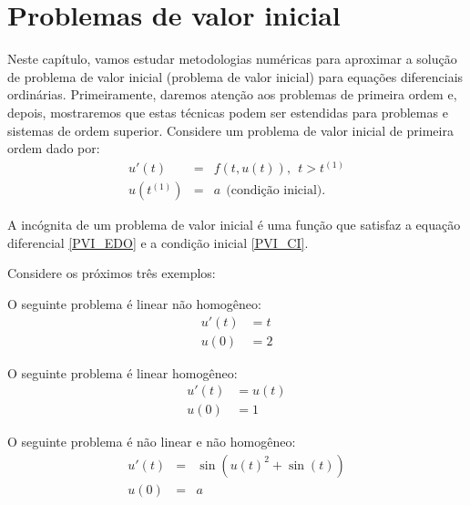 
%

\chapter{Problemas de valor inicial}
Neste capítulo, vamos estudar metodologias numéricas para aproximar a solução de problema de valor inicial (problema de valor inicial) para equações diferenciais ordinárias. Primeiramente, daremos atenção aos problemas de primeira ordem e, depois, mostraremos que estas técnicas podem ser estendidas para problemas e sistemas de ordem superior. Considere um problema de valor inicial de primeira ordem dado por:
\begin{subequations}\label{PVI}
\begin{eqnarray}
  u'(t) &=& f(t, u(t)),~~t>t^{(1)}\label{PVI_EDO}\\
  u(t^{(1)}) &=& a ~~ \text{(condição inicial)}.\label{PVI_CI}
\end{eqnarray}
\end{subequations}

A incógnita de um problema de valor inicial é uma função que satisfaz a equação diferencial \eqref{PVI_EDO} e a condição inicial \eqref{PVI_CI}.

Considere os próximos três exemplos:
\begin{ex} O seguinte problema é linear não homogêneo:
\begin{eqnarray}
   u'(t) &=t\\
   u(0) &= 2
\end{eqnarray}
\end{ex}

\begin{ex} O seguinte problema é linear homogêneo:
\begin{eqnarray}
   u'(t) &=u(t)\\
            u(0) &= 1
\end{eqnarray}
\end{ex}

\begin{ex} O seguinte problema é não linear e não homogêneo:
\begin{eqnarray}
   u'(t) &=&\sin(u(t)^2+\sin(t))\\
            u(0) &=& a
\end{eqnarray}
\end{ex}

